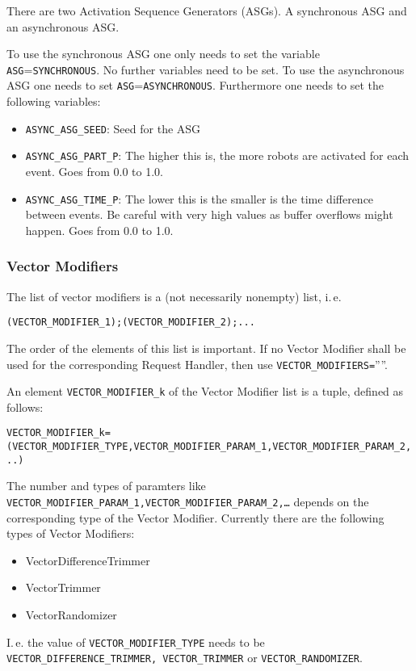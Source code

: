 There are two Activation Sequence Generators (ASGs). A synchronous ASG and an asynchronous ASG.

To use the synchronous ASG one only needs to set the variable \texttt{ASG}=\texttt{SYNCHRONOUS}. No further variables need to be set.
To use the asynchronous ASG one needs to set \texttt{ASG}=\texttt{ASYNCHRONOUS}. Furthermore one needs to set the following variables:
\begin{itemize}
\item \texttt{ASYNC\_ASG\_SEED}: Seed for the ASG
\item \texttt{ASYNC\_ASG\_PART\_P}: The higher this is, the more robots are activated for each event. Goes from 0.0 to 1.0.
\item \texttt{ASYNC\_ASG\_TIME\_P}: The lower this is the smaller is the time difference between events. Be careful with very high values as buffer overflows might happen. Goes from 0.0 to 1.0.
\end{itemize}

\subsubsection{Vector Modifiers}\label{sec:vectorModifiers}

The list of vector modifiers is a (not necessarily nonempty) list, i.\,e. 
\begin{center}\scriptsize
	\texttt{(VECTOR\_MODIFIER\_1);(VECTOR\_MODIFIER\_2);...}
\end{center}
The order of the elements of this list is important. If no Vector Modifier shall be used for the corresponding Request Handler, then use \texttt{VECTOR\_MODIFIERS=}''''.

An element \texttt{VECTOR\_MODIFIER\_k} of the Vector Modifier list is a tuple, defined as follows:
\begin{center}\scriptsize
	\texttt{VECTOR\_MODIFIER\_k=(VECTOR\_MODIFIER\_TYPE,VECTOR\_MODIFIER\_PARAM\_1,VECTOR\_MODIFIER\_PARAM\_2,..)}
\end{center}
The number and types of paramters like \texttt{VECTOR\_MODIFIER\_PARAM\_1,\newline VECTOR\_MODIFIER\_PARAM\_2,\dots} depends on the corresponding type of the Vector Modifier. Currently there are the following types of Vector Modifiers:
\begin{itemize}
	\item VectorDifferenceTrimmer
	\item VectorTrimmer
	\item VectorRandomizer
\end{itemize}
I.\,e. the value of \texttt{VECTOR\_MODIFIER\_TYPE} needs to be \texttt{VECTOR\_DIFFERENCE\_TRIMMER, VECTOR\_TRIMMER} or \texttt{VECTOR\_RANDOMIZER}.

